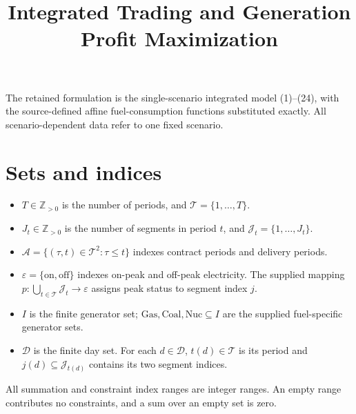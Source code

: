 \documentclass[11pt,a4paper]{article}
\title{Integrated Trading and Generation Profit Maximization}
\author{}
\date{}
\begin{document}
\maketitle

The retained formulation is the single-scenario integrated model (1)--(24), with the source-defined affine fuel-consumption functions substituted exactly.  All scenario-dependent data refer to one fixed scenario.

\section*{Sets and indices}
\begin{itemize}
\item $T\in\mathbb Z_{>0}$ is the number of periods, and $\mathcal T=\{1,\ldots,T\}$.
\item $J_t\in\mathbb Z_{>0}$ is the number of segments in period $t$, and $\mathcal J_t=\{1,\ldots,J_t\}$.
\item $\mathcal A=\{(\tau,t)\in\mathcal T^2:\tau\le t\}$ indexes contract periods and delivery periods.
\item $\varepsilon=\{\mathrm{on},\mathrm{off}\}$ indexes on-peak and off-peak electricity. The supplied mapping $p:\bigcup_{t\in\mathcal T}\mathcal J_t\to\varepsilon$ assigns peak status to segment index $j$.
\item $I$ is the finite generator set; $\mathrm{Gas},\mathrm{Coal},\mathrm{Nuc}\subseteq I$ are the supplied fuel-specific generator sets.
\item $\mathcal D$ is the finite day set. For each $d\in\mathcal D$, $t(d)\in\mathcal T$ is its period and $j(d)\subseteq\mathcal J_{t(d)}$ contains its two segment indices.
\end{itemize}
All summation and constraint index ranges are integer ranges. An empty range contributes no constraints, and a sum over an empty set is zero.
\end{document}
